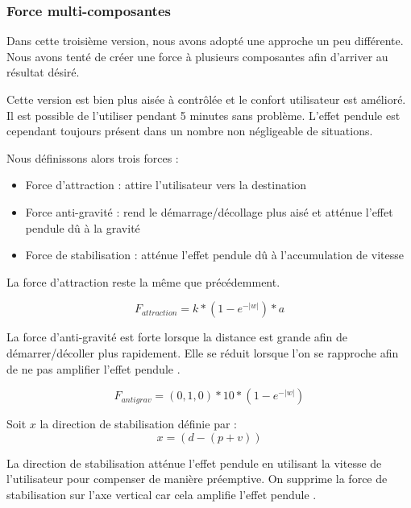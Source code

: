 \documentclass[a4paper]{elsarticle}
\begin{document}
\subsubsection{Force multi-composantes}

Dans cette troisième version, nous avons adopté une approche un peu différente. Nous avons tenté de créer une force à plusieurs composantes afin d'arriver au résultat désiré.

Cette version est bien plus aisée à contrôlée et le confort utilisateur est amélioré. Il est possible de l'utiliser pendant 5 minutes sans problème. \og L'effet pendule \fg{} est cependant toujours présent dans un nombre non négligeable de situations.

Nous définissons alors trois forces :
\begin{itemize}
\item Force d'attraction : attire l'utilisateur vers la destination
\item Force anti-gravité : rend le \og démarrage/décollage \fg{} plus aisé et atténue \og l'effet pendule \fg{} dû à la gravité
\item Force de stabilisation : atténue \og l'effet pendule \fg{} dû à l'accumulation de vitesse
\end{itemize}

La force d'attraction reste la même que précédemment.

\begin{equation}
    F_{attraction} = k * (1 - e^{-|w|}) * a
\end{equation}

La force d'anti-gravité est forte lorsque la distance est grande afin de \og démarrer/décoller \fg{} plus rapidement. Elle se réduit lorsque l'on se rapproche afin de ne pas amplifier \og l'effet pendule \fg{}.

\begin{equation}
    F_{antigrav} = (0, 1, 0) * 10 * (1 - e^{-|w|})
\end{equation}

Soit $x$ la direction de stabilisation définie par :
\begin{equation}
    x = (d - (p + v))
\end{equation}

La direction de stabilisation atténue \og l'effet pendule \fg{} en utilisant la vitesse de l'utilisateur pour compenser de manière préemptive. On supprime la force de stabilisation sur l'axe vertical car cela amplifie \og l'effet pendule \fg{}.
\end{document}
